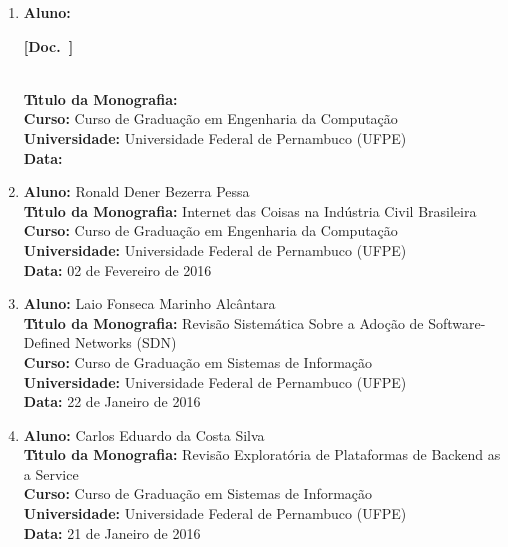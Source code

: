 \documentclass[a4paper,oneside,10pt]{article}
\newcounter{document}%
\newcommand\Doc{{\addtocounter{document}{1}\mbox{\sffamily\bfseries [Doc. \arabic{document}]}}}
\begin{document}
\begin{enumerate}
\renewcommand{\labelenumi}{{\large\bfseries\arabic{enumi}.}}
\vspace{0.3cm}

\item       \textbf{Aluno:} \Doc \\
            \textbf{T\'{\i}tulo da Monografia:} \\
            \textbf{Curso:} Curso de Gradua\c{c}\~{a}o em Engenharia da Computa\c{c}\~{a}o\\
            \textbf{Universidade:} Universidade Federal de Pernambuco (UFPE)\\
            \textbf{Data:} 

\item       \textbf{Aluno:} Ronald Dener Bezerra Pessa \mbox{}\\
            \textbf{T\'{\i}tulo da Monografia:} Internet das Coisas na Indústria Civil Brasileira\\
            \textbf{Curso:} Curso de Gradua\c{c}\~{a}o em Engenharia da Computa\c{c}\~{a}o\\
            \textbf{Universidade:} Universidade Federal de Pernambuco (UFPE)\\
            \textbf{Data:} 02 de Fevereiro de 2016

\item       \textbf{Aluno:} Laio Fonseca Marinho Alcântara \mbox{} \\
            \textbf{T\'{\i}tulo da Monografia:} Revisão Sistemática Sobre a Adoção de Software-Defined Networks (SDN)\\
            \textbf{Curso:} Curso de Gradua\c{c}\~{a}o em Sistemas de Informa\c{c}\~{a}o\\
            \textbf{Universidade:} Universidade Federal de Pernambuco (UFPE)\\
            \textbf{Data:} 22 de Janeiro de 2016

\item       \textbf{Aluno:} Carlos Eduardo da Costa Silva \mbox{} \\
            \textbf{T\'{\i}tulo da Monografia:} Revisão Exploratória de Plataformas de Backend as a Service\\
            \textbf{Curso:} Curso de Gradua\c{c}\~{a}o em Sistemas de Informa\c{c}\~{a}o\\
            \textbf{Universidade:} Universidade Federal de Pernambuco (UFPE)\\
            \textbf{Data:} 21 de Janeiro de 2016


\end{enumerate}
\end{document}
